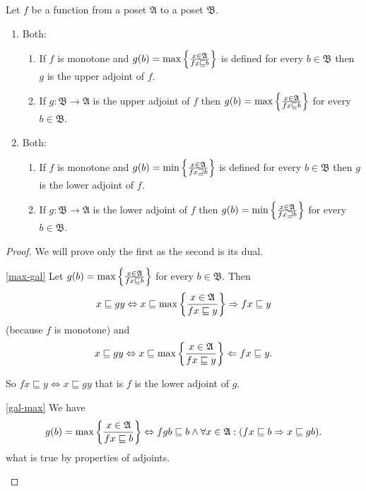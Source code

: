 \begin{thm}\label{adj-max}
Let $f$ be a function from a poset $\mathfrak{A}$ to a poset $\mathfrak{B}$.
\begin{enumerate}
\item Both:

\begin{enumerate}
\item \label{max-gal}If $f$ is monotone and $g(b)=\max\left\{ \frac{x\in\mathfrak{A}}{fx\sqsubseteq b}\right\}$
is defined for every $b\in\mathfrak{B}$ then $g$ is the upper adjoint
of $f$.
\item \label{gal-max}If $g:\mathfrak{B}\rightarrow\mathfrak{A}$ is the
upper adjoint of $f$ then $g(b)=\max\left\{ \frac{x\in\mathfrak{A}}{fx\sqsubseteq b}\right\}$
for every $b\in\mathfrak{B}$.
\end{enumerate}
\item Both:

\begin{enumerate}
\item If $f$ is monotone and $g(b)=\min\left\{ \frac{x\in\mathfrak{A}}{fx\sqsupseteq b}\right\}$
is defined for every $b\in\mathfrak{B}$ then $g$ is the lower adjoint
of $f$.
\item If $g:\mathfrak{B}\rightarrow\mathfrak{A}$ is the lower adjoint of
$f$ then $g(b)=\min\left\{ \frac{x\in\mathfrak{A}}{fx\sqsupseteq b}\right\}$
for every $b\in\mathfrak{B}$.
\end{enumerate}
\end{enumerate}
\end{thm}
\begin{proof}
We will prove only the first as the second is its dual.
\begin{widedisorder}
\item [{\ref{max-gal}}] Let $g(b)=\max\left\{ \frac{x\in\mathfrak{A}}{fx\sqsubseteq b}\right\}$
for every $b\in\mathfrak{B}$. Then
\[
x\sqsubseteq gy\Leftrightarrow x\sqsubseteq\max\left\{ \frac{x\in\mathfrak{A}}{fx\sqsubseteq y}\right\}\Rightarrow fx\sqsubseteq y
\]
(because $f$ is monotone) and
\[
x\sqsubseteq gy\Leftrightarrow x\sqsubseteq\max\left\{ \frac{x\in\mathfrak{A}}{fx\sqsubseteq y}\right\}\Leftarrow fx\sqsubseteq y.
\]



So $fx\sqsubseteq y\Leftrightarrow x\sqsubseteq gy$ that is $f$
is the lower adjoint of $g$.

\item [{\ref{gal-max}}] We have
\[
g(b)=\max\left\{ \frac{x\in\mathfrak{A}}{fx\sqsubseteq b}\right\}\Leftrightarrow fgb\sqsubseteq b\land\forall x\in\mathfrak{A}:(fx\sqsubseteq b\Rightarrow x\sqsubseteq gb).
\]
what is true by properties of adjoints.
\end{widedisorder}
\end{proof}
